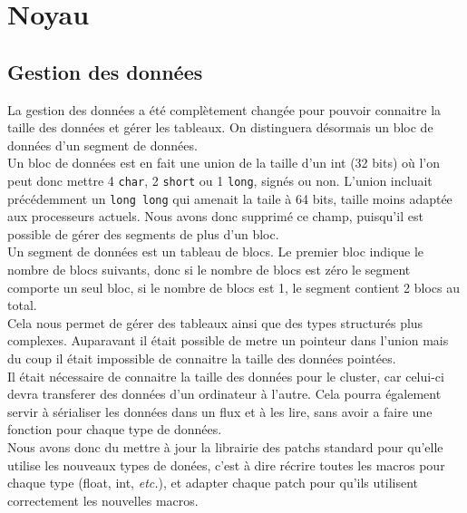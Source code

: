 
\chapter{Noyau}

\section{Gestion des donn\'ees}
\label{noyau_donnees}

La gestion des donn\'ees a \'et\'e compl\`etement chang\'ee pour
pouvoir connaitre la taille des donn\'ees et  g\'erer les tableaux.
On distinguera d\'esormais un bloc de donn\'ees d'un segment de donn\'ees.\\

Un bloc de donn\'ees est en fait une union de la taille d'un int (32 bits)
o\`u l'on peut donc mettre 4 {\tt char}, 2 {\tt short} ou 1 {\tt long},
 sign\'es ou non.
L'union incluait pr\'ec\'edemment un {\tt long long} qui amenait la taile
\`a 64 bits, taille moins adapt\'ee aux processeurs actuels. Nous avons donc
supprim\'e ce champ, puisqu'il est possible de g\'erer des segments de plus
d'un bloc.\\

Un segment de donn\'ees est un tableau de blocs.
Le premier bloc indique le nombre de blocs suivants,
donc si le nombre de blocs est z\'ero le segment comporte un seul bloc,
si le nombre de blocs est 1, le segment contient 2 blocs au total.\\

Cela nous permet de g\'erer des tableaux ainsi que des types structur\'es
plus complexes. Auparavant il \'etait possible de metre un pointeur
dans l'union mais du coup il \'etait impossible de connaitre
la taille des donn\'ees point\'ees.\\

Il \'etait n\'ecessaire de connaitre la taille des donn\'ees pour le cluster,
car celui-ci devra transferer des donn\'ees d'un ordinateur
\`a l'autre. Cela pourra \'egalement servir \`a s\'erialiser les donn\'ees
dans un flux et \`a les lire, sans avoir a faire une fonction pour chaque
type de donn\'ees.\\

Nous avons donc du mettre \`a jour la librairie des patchs standard
pour qu'elle utilise les nouveaux types de don\'ees, c'est \`a dire r\'ecrire
toutes les macros pour chaque type (float, int, {\em etc.}), et adapter
chaque patch pour qu'ils utilisent correctement les nouvelles macros.\\

